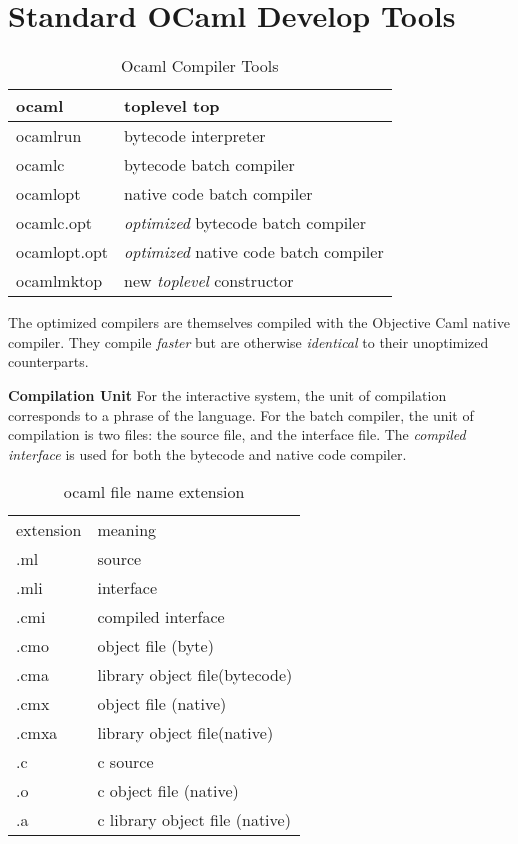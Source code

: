 \section{Standard OCaml Develop Tools}



\begin{table}[ht]
\caption{Ocaml Compiler Tools}
\centering

\begin{tabular}{|l|l|}
  \hline
  ocaml & toplevel top \\
  \hline
  ocamlrun & bytecode interpreter \\
  \hline
  ocamlc & bytecode batch compiler \\
  \hline
  ocamlopt & native code batch compiler \\
  \hline
  ocamlc.opt & \textit{optimized} bytecode batch compiler \\
  \hline
  ocamlopt.opt & \textit{optimized} native code batch compiler \\
  \hline
  ocamlmktop & new \textit{toplevel} constructor \\
  \hline
\end{tabular}
\label{table:ocamlcoption}
\end{table}

The optimized compilers are themselves compiled with the Objective
Caml native compiler.  They compile \textit{faster} but are otherwise
\textit{identical} to their unoptimized counterparts.

\textbf{Compilation Unit} For the interactive system, the unit of
compilation corresponds to a phrase of the language. For the batch
compiler, the unit of compilation is two files: the source file, and
the interface file. The \textit{compiled interface} is used for both
the bytecode and native code compiler.

\begin{table}
  \centering
  \begin{tabular}{|l|l|}
  \hline
  extension & meaning \\
  .ml & source \\
  .mli & interface \\
  .cmi & compiled interface \\
  .cmo & object file (byte) \\
  .cma & library object file(bytecode) \\
  .cmx & object file (native) \\
  .cmxa & library object file(native) \\
  \hline
  .c & c source \\
  .o & c object file (native) \\
  .a & c library object file (native) \\
  \hline
  \end{tabular}
  \caption{ocaml file name extension}
  \label{tab:ocaml_file_ext}
\end{table}

